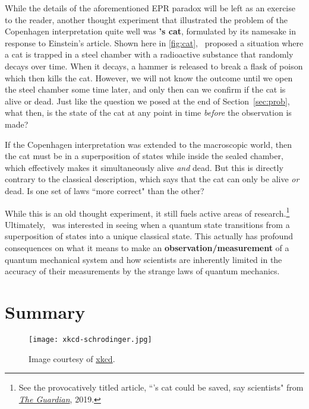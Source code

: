 While the details of the aforementioned EPR paradox will be left as an exercise to the reader, another thought experiment that illustrated the problem of the Copenhagen interpretation quite well was \textbf{\Sch's cat}, formulated by its namesake in response to Einstein's article. 
Shown here in \autoref{fig:cat}, \Sch\ proposed a situation where a cat is trapped in a steel chamber with a radioactive substance that randomly decays over time. 
When it decays, a hammer is released to break a flask of poison which then kills the cat. 
However, we will not know the outcome until we open the steel chamber some time later, and only then can we confirm if the cat is alive or dead. 
Just like the question we posed at the end of Section~\ref{sec:prob}, what then, is the state of the cat at any point in time \emph{before} the observation is made? 

If the Copenhagen interpretation was extended to the macroscopic world, then the cat must be in a superposition of states while inside the sealed chamber, which effectively makes it simultaneously alive \emph{and} dead. 
But this is directly contrary to the classical description, which says that the cat can only be alive \emph{or} dead. 
Is one set of laws ``more correct" than the other? 

While this is an old thought experiment, it still fuels active areas of research.\footnote{See the provocatively titled article, ``\Sch's cat could be saved, say scientists" from \href{https://www.theguardian.com/science/2019/jun/03/feline-fine-fate-of-schrodingers-cat-can-be-reversed-study}{\emph{The Guardian}}, 2019.}
Ultimately, \Sch\ was interested in seeing when a quantum state transitions from a superposition of states into a unique classical state. 
This actually has profound consequences on what it means to make an \textbf{observation/measurement} of a quantum mechanical system and how scientists are inherently limited in the accuracy of their measurements by the strange laws of quantum mechanics.


\section{Summary}

\begin{figure}[!h]
	\centering
	\texttt{[image: xkcd-schrodinger.jpg]}
	\caption{Image courtesy of \href{https://xkcd.com/45/}{xkcd}.}
	\label{fig:xkcd2}
\end{figure}

